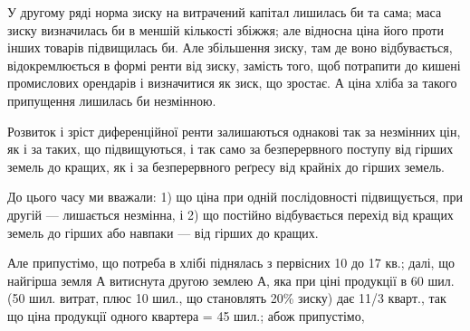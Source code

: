 У другому ряді норма зиску на витрачений капітал лишилась би та
сама; маса зиску визначилась би в меншій кількості збіжжя; але відносна ціна
його проти інших товарів підвищилась би. Але збільшення зиску, там де воно
відбувається, відокремлюється в формі ренти від зиску, замість того, щоб потрапити
до кишені промислових орендарів і визначитися як зиск, що зростає.
А ціна хліба за такого припущення лишилась би незмінною.

Розвиток і зріст диференційної ренти залишаються однакові так за незмінних
цін, як і за таких, що підвищуються, і так само за безперервного поступу
від гірших земель до кращих, як і за безперервного реґресу від крайніх
до гірших земель.

До цього часу ми вважали: 1) що ціна при одній послідовності підвищується,
при другій — лишається незмінна, і 2) що постійно відбувається перехід
від кращих земель до гірших або навпаки — від гірших до кращих.

Але припустімо, що потреба в хлібі піднялась з первісних 10 до 17 кв.;
далі, що найгірша земля А витиснута другою землею А, яка при ціні продукції
в 60 шил. (50 шил. витрат, плюс 10 шил., що становлять 20\% зиску) дає
11/3 кварт., так що ціна продукції одного квартера = 45 шил.; абож припустімо,
\parbreak{}  %
